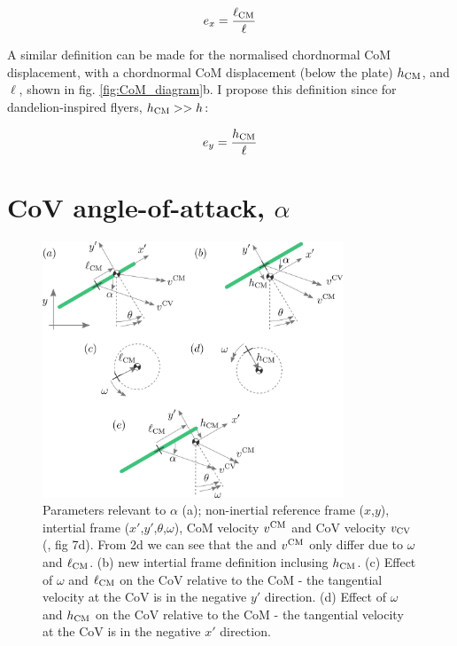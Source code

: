 \documentclass[draft]{jfm} %
\begin{document}
\begin{equation} e_{x}  = \frac{\ell_{\textup{CM}}}{\ell} \label{eq:ex} \end{equation}

A similar definition can be made for the normalised chordnormal CoM displacement, with a chordnormal CoM displacement (below the plate) $h_{\textup{CM}}$, and $\ell$, shown in fig. \ref{fig:CoM_diagram}b. I propose this definition since for dandelion-inspired flyers, $h_{\textup{CM}}>>h$:

\begin{equation} e_{y}  = \frac{h_{\textup{CM}}}{\ell} \label{eq:ey} \end{equation}

\section{CoV angle-of-attack, $\alpha$} \label{sec:alpha}

\begin{figure}
    \centering
    \includegraphics[width=0.8\textwidth]{pics/alpha_diagram.png}
    \caption{Parameters relevant to $\alpha$ (a); non-inertial reference frame ($x$,$y$), intertial frame ($x'$,$y'$,$\theta$,$\omega$), CoM velocity $v^{\textup{CM}}$ and CoV velocity $v_{\textup{CV}}$ (\cite{Li2022model}, fig 7d). From
    2d we can see that the and $v^{\textup{CM}}$ only differ due to $\omega$ and $\ell_{\textup{CM}}$. (b) new intertial frame definition inclusing $h_{\textup{CM}}$. (c) Effect of $\omega$ and $\ell_{\textup{CM}}$ on the CoV relative to the CoM - the tangential velocity at the CoV is in the negative $y'$ direction. (d) Effect of $\omega$ and $h_{\textup{CM}}$ on the CoV relative to the CoM - the tangential velocity at the CoV is in the negative $x'$ direction.}
    \label{fig:alpha_diagram}
\end{figure}
\end{document}

